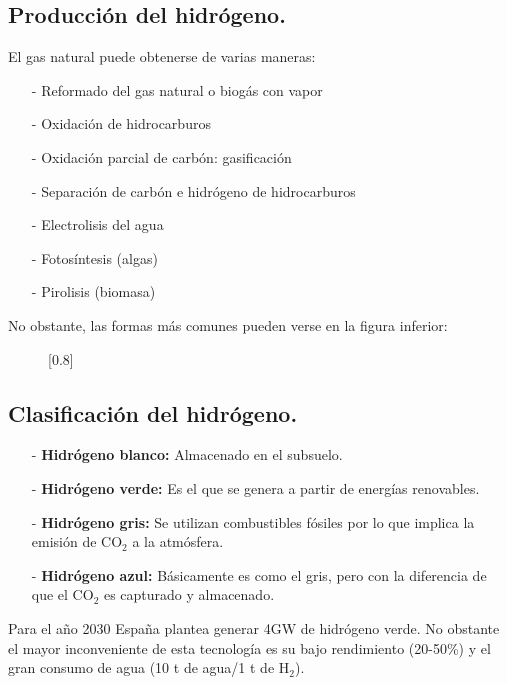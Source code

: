 \subsection{Producción del hidrógeno.}
El gas natural puede obtenerse de varias maneras:
\begin{itemize}
	\item [-]Reformado del gas natural o biogás con vapor
	\item [-]Oxidación de hidrocarburos
	\item [-]Oxidación parcial de carbón: gasificación
	\item [-]Separación de carbón e hidrógeno de hidrocarburos
	\item [-]Electrolisis del agua
	\item [-]Fotosíntesis (algas)
	\item [-]Pirolisis (biomasa)
\end{itemize}
No obstante, las formas más comunes pueden verse en la figura inferior:
\begin{figure}[H]
	\begin{center}
		\scalebox{0.8}[0.8]{
	}	\end{center}
\end{figure}
\subsection{Clasificación del hidrógeno.}
\begin{itemize}
	\item [-]\textbf{Hidrógeno blanco:} Almacenado en el subsuelo.
	\item [-]\textbf{Hidrógeno verde:} Es el que se genera a partir de energías renovables.
	\item [-]\textbf{Hidrógeno gris:} Se utilizan combustibles fósiles	por lo que implica la emisión de CO$_2$ a la atmósfera.
	\item [-]\textbf{Hidrógeno azul:} Básicamente es como el gris, pero con la diferencia de que el CO$_2$ es
	capturado y almacenado.
\end{itemize}
Para el año 2030 España plantea generar 4GW de hidrógeno verde. No obstante el mayor inconveniente de esta tecnología es su bajo rendimiento (20-50\%) y el gran consumo de agua (10 t de agua/1 t de H$_2$).
\newpage
